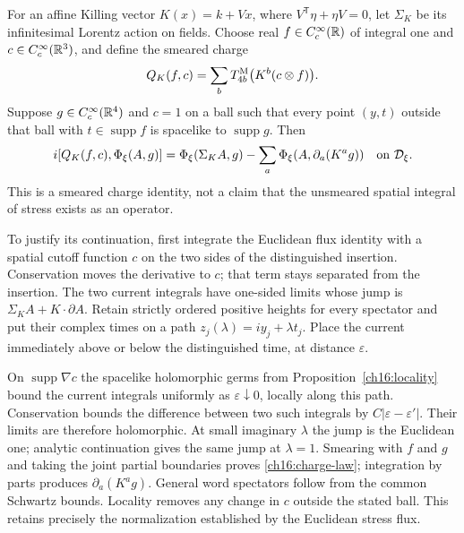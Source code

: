 For an affine Killing vector $K(x)=k+Vx$, where
$V^{\mathsf T}\eta+\eta V=0$, let $\Sigma_K$ be its infinitesimal
Lorentz action on fields. Choose real $f\in C_c^\infty(\mathbb R)$ of integral
one and $c\in C_c^\infty(\mathbb R^3)$, and define the smeared charge
\[
 Q_K(f,c)=\sum_b T^{\rm M}_{4b}\big(K^b(c\otimes f)\big).
\]
Suppose $g\in C_c^\infty(\mathbb R^4)$ and $c=1$ on a ball such that every
point $(y,t)$ outside that ball with $t\in\operatorname{supp}f$ is
spacelike to $\operatorname{supp}g$. Then
\begin{equation}
 i[Q_K(f,c),\Phi_\xi(A,g)]
   =\Phi_\xi(\Sigma_K A,g)
          -\sum_a\Phi_\xi(A,\partial_a(K^ag))
                       \quad\hbox{on }\mathcal D_\xi.
 \label{ch16:charge-law}
\end{equation}
This is a smeared charge identity, not a claim that the unsmeared spatial
integral of stress exists as an operator.

To justify its continuation, first integrate the Euclidean flux identity
with a spatial cutoff function $c$ on the two sides of the distinguished insertion.
Conservation moves the derivative to $c$; that term stays separated from
the insertion. The two current integrals have one-sided limits whose
jump is $\Sigma_K A+K\cdot\partial A$. Retain strictly ordered positive
heights for every spectator and put their complex times on a path
$z_j(\lambda)=iy_j+\lambda t_j$. Place the current immediately above
or below the distinguished time, at distance $\varepsilon$.

On $\operatorname{supp}\nabla c$ the spacelike holomorphic germs from
Proposition~\ref{ch16:locality} bound the current integrals uniformly
as $\varepsilon\downarrow0$, locally along this path. Conservation bounds
the difference between two such integrals by $C|\varepsilon-\varepsilon'|$.
Their limits are therefore holomorphic. At small imaginary $\lambda$
the jump is the Euclidean one; analytic continuation gives the same
jump at $\lambda=1$. Smearing with $f$ and $g$ and taking the joint
partial boundaries proves \eqref{ch16:charge-law}; integration by parts
produces $\partial_a(K^ag)$. General word spectators follow from the
common Schwartz bounds. Locality removes any change in $c$ outside the
stated ball. This retains precisely the normalization established by the
Euclidean stress flux.
